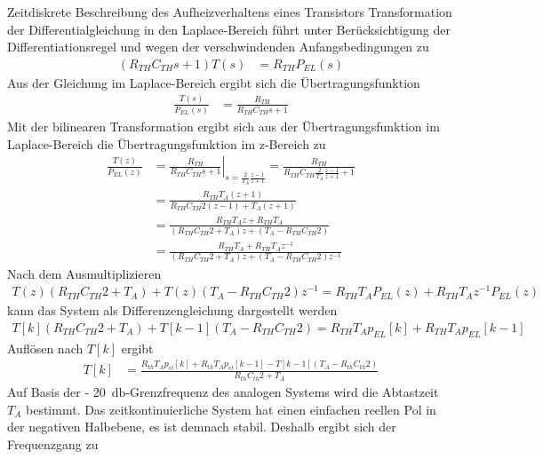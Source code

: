 \begin{example}{Zeitdiskrete Beschreibung des Aufheizverhaltens eines Transistors}
Transformation der Differentialgleichung in den Laplace-Bereich führt unter Berücksichtigung der Differentiationsregel und wegen der verschwindenden Anfangsbedingungen zu
\begin{align*}
\left( R_{TH}  C_{TH}  s + 1 \right)  T(s) &= R_{TH}  P_{EL}(s) 
\end{align*}
Aus der Gleichung im Laplace-Bereich ergibt sich die Übertragungsfunktion
\begin{align*}
\frac{T(s)}{P_{EL}(s)} &= \frac{R_{TH}}{R_{TH}  C_{TH}  s + 1} 
\end{align*}
Mit der bilinearen Transformation ergibt sich aus der Übertragungsfunktion im Laplace-Bereich die Übertragungsfunktion im z-Bereich zu
\begin{align*}
{\frac{T\left(z\right)}{P_{EL} \left(z\right)} } &=  {\left. \frac{R_{TH} }{R_{TH}  C_{TH}  s+1} \right|_{s=\frac{2}{T_{A} }  \frac{z-1}{z+1} } =\frac{R_{TH} }{R_{TH}  C_{TH}  \frac{2}{T_{A} }  \frac{z-1}{z+1} +1} } \\
{} &=  {\frac{R_{TH}  T_{A}  \left(z+1\right)}{R_{TH}  C_{TH}  2 \left(z-1\right)+T_{A}  \left(z+1\right)} } \\
{} &=  {\frac{R_{TH}  T_{A}  z+R_{TH}  T_{A} }{\left(R_{TH}  C_{TH}  2+T_{A} \right) z+\left(T_{A} -R_{TH}  C_{TH}  2\right)} } \\
{} &=  {\frac{R_{TH}  T_{A} +R_{TH}  T_{A}  z^{-1} }{\left(R_{TH}  C_{TH}  2+T_{A} \right) z+\left(T_{A} -R_{TH}  C_{TH}  2\right) z^{-1} } }
\end{align*}
Nach dem Ausmultiplizieren
\begin{align*}
{T(z)  \left( R_{TH}  C_{TH}  2 + T_{A} \right) + T(z)  \left( T_{A} - R_{TH}  C_{TH}  2 \right)  z^{- 1}
}{= R_{TH}  T_{A}  P_{EL}(z) + R_{TH}  T_{A}  z^{- 1}  P_{EL}(z)} 
\end{align*}
kann das System als Differenzengleichung dargestellt werden
\begin{align*}
{T[ k]  \left( R_{TH}  C_{TH}  2 + T_{A} \right) + T[ k - 1]  \left( T_{A} - R_{TH}  C_{TH}  2 \right)
}{= R_{TH}  T_{A}  p_{EL}[ k] + R_{TH}  T_{A}  p_{EL}[ k - 1]} 
\end{align*}
Auflösen nach \(T[k]\) ergibt
\begin{align*}
T[ k] &= \frac{R_{th}  T_{A}  p_{el}[ k] + R_{th}  T_{A}  p_{el}[ k - 1] - T[ k - 1]  \left( T_{A} - R_{th}  C_{th}  2 \right)}{R_{th}  C_{th}  2 + T_{A}} 
\end{align*}
Auf Basis der - \qty{20}{\decibel}-Grenzfrequenz des analogen Systems wird die Abtastzeit \(T_{A}\) bestimmt. Das zeitkontinuierliche System hat einen einfachen reellen Pol in der negativen Halbebene, es ist demnach stabil. Deshalb ergibt sich der Frequenzgang zu

\end{example}
